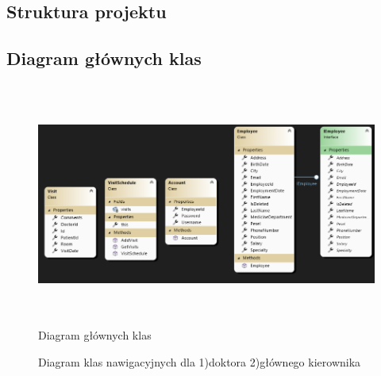 \begin{flushleft}
\section{\LARGE{Struktura projektu}}
\end{flushleft}

\begin{flushleft}
    \subsection{\Large{Diagram głównych klas}}
    \begin{figure}[H]
    \begin{center}
	\includegraphics[height=8cm]{images/diag_gl_kl.png}
        \caption{Diagram głównych klas}
        \label{fig:diag_gl_kl}
    \end{center}
    \end{figure}

    \begin{figure}[H]
    \centering
    \caption{Diagram klas nawigacyjnych dla 1)doktora 2)głównego kierownika}
 

\end{figure}
\end{flushleft}
